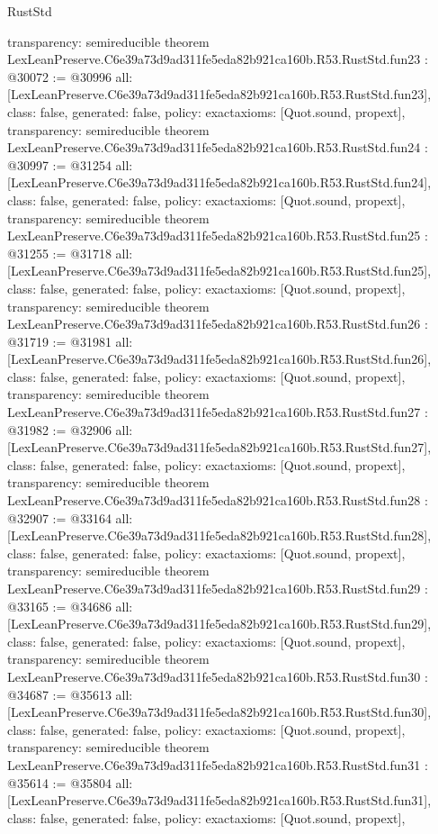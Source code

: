\begin{lexlean}{RustStd}
\begin{coremodule}
{  transparency: semireducible
}
theorem LexLeanPreserve.C6e39a73d9ad311fe5eda82b921ca160b.R53.RustStd.fun23 : @30072 := @30996 {
  all: [LexLeanPreserve.C6e39a73d9ad311fe5eda82b921ca160b.R53.RustStd.fun23],
  class: false,
  generated: false,
  policy: exact{axioms: [Quot.sound, propext]},
  transparency: semireducible
}
theorem LexLeanPreserve.C6e39a73d9ad311fe5eda82b921ca160b.R53.RustStd.fun24 : @30997 := @31254 {
  all: [LexLeanPreserve.C6e39a73d9ad311fe5eda82b921ca160b.R53.RustStd.fun24],
  class: false,
  generated: false,
  policy: exact{axioms: [Quot.sound, propext]},
  transparency: semireducible
}
theorem LexLeanPreserve.C6e39a73d9ad311fe5eda82b921ca160b.R53.RustStd.fun25 : @31255 := @31718 {
  all: [LexLeanPreserve.C6e39a73d9ad311fe5eda82b921ca160b.R53.RustStd.fun25],
  class: false,
  generated: false,
  policy: exact{axioms: [Quot.sound, propext]},
  transparency: semireducible
}
theorem LexLeanPreserve.C6e39a73d9ad311fe5eda82b921ca160b.R53.RustStd.fun26 : @31719 := @31981 {
  all: [LexLeanPreserve.C6e39a73d9ad311fe5eda82b921ca160b.R53.RustStd.fun26],
  class: false,
  generated: false,
  policy: exact{axioms: [Quot.sound, propext]},
  transparency: semireducible
}
theorem LexLeanPreserve.C6e39a73d9ad311fe5eda82b921ca160b.R53.RustStd.fun27 : @31982 := @32906 {
  all: [LexLeanPreserve.C6e39a73d9ad311fe5eda82b921ca160b.R53.RustStd.fun27],
  class: false,
  generated: false,
  policy: exact{axioms: [Quot.sound, propext]},
  transparency: semireducible
}
theorem LexLeanPreserve.C6e39a73d9ad311fe5eda82b921ca160b.R53.RustStd.fun28 : @32907 := @33164 {
  all: [LexLeanPreserve.C6e39a73d9ad311fe5eda82b921ca160b.R53.RustStd.fun28],
  class: false,
  generated: false,
  policy: exact{axioms: [Quot.sound, propext]},
  transparency: semireducible
}
theorem LexLeanPreserve.C6e39a73d9ad311fe5eda82b921ca160b.R53.RustStd.fun29 : @33165 := @34686 {
  all: [LexLeanPreserve.C6e39a73d9ad311fe5eda82b921ca160b.R53.RustStd.fun29],
  class: false,
  generated: false,
  policy: exact{axioms: [Quot.sound, propext]},
  transparency: semireducible
}
theorem LexLeanPreserve.C6e39a73d9ad311fe5eda82b921ca160b.R53.RustStd.fun30 : @34687 := @35613 {
  all: [LexLeanPreserve.C6e39a73d9ad311fe5eda82b921ca160b.R53.RustStd.fun30],
  class: false,
  generated: false,
  policy: exact{axioms: [Quot.sound, propext]},
  transparency: semireducible
}
theorem LexLeanPreserve.C6e39a73d9ad311fe5eda82b921ca160b.R53.RustStd.fun31 : @35614 := @35804 {
  all: [LexLeanPreserve.C6e39a73d9ad311fe5eda82b921ca160b.R53.RustStd.fun31],
  class: false,
  generated: false,
  policy: exact{axioms: [Quot.sound, propext]},
}
\end{coremodule}
\end{lexlean}
